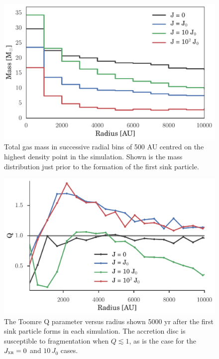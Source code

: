 \documentclass[../thesis.tex]{subfiles}
\begin{document}
\begin{figure}
  \begin{center}
    \includegraphics[width=\columnwidth]{figures/radial_bins/mass_bins}
    \caption{Total gas mass in successive radial bins of 500 AU centred on the highest density point in the simulation.  Shown is the mass distribution just prior to the formation of the first sink particle.}
    \label{mbins}
  \end{center}
\end{figure}

\begin{figure}
  \begin{center}
    \includegraphics[width=\columnwidth]{figures/radial_bins/toomreQ}
    \caption{The Toomre Q parameter versus radius shown 5000 yr after the first sink particle forms in each simulation.  The accretion disc is susceptible to fragmentation when $Q\lesssim1$, as is the case for the  $J_{\textsc{xr}}= 0$ and $10\,J_0$ cases.}
    \label{toomreQ}
  \end{center}
\end{figure}
\end{document}
